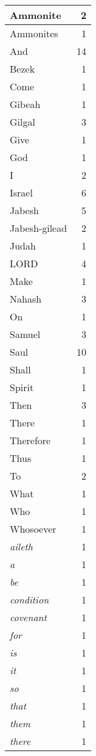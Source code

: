 \begin{center}
\begin{longtable}{l|r}
\hline \hline
\endlastfoot
Ammonite & 2 \\ \hline
Ammonites & 1 \\ \hline
And & 14 \\ \hline
Bezek & 1 \\ \hline
Come & 1 \\ \hline
Gibeah & 1 \\ \hline
Gilgal & 3 \\ \hline
Give & 1 \\ \hline
God & 1 \\ \hline
I & 2 \\ \hline
Israel & 6 \\ \hline
Jabesh & 5 \\ \hline
Jabesh-gilead & 2 \\ \hline
Judah & 1 \\ \hline
LORD & 4 \\ \hline
Make & 1 \\ \hline
Nahash & 3 \\ \hline
On & 1 \\ \hline
Samuel & 3 \\ \hline
Saul & 10 \\ \hline
Shall & 1 \\ \hline
Spirit & 1 \\ \hline
Then & 3 \\ \hline
There & 1 \\ \hline
Therefore & 1 \\ \hline
Thus & 1 \\ \hline
To & 2 \\ \hline
What & 1 \\ \hline
Who & 1 \\ \hline
Whosoever & 1 \\ \hline
\emph{aileth} & 1 \\ \hline
\emph{a} & 1 \\ \hline
\emph{be} & 1 \\ \hline
\emph{condition} & 1 \\ \hline
\emph{covenant} & 1 \\ \hline
\emph{for} & 1 \\ \hline
\emph{is} & 1 \\ \hline
\emph{it} & 1 \\ \hline
\emph{so} & 1 \\ \hline
\emph{that} & 1 \\ \hline
\emph{them} & 1 \\ \hline
\emph{there} & 1 \\ \hline

\end{longtable}
\end{center}
